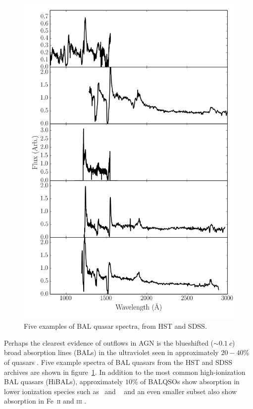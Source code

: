 \begin{figure}
\centering
\includegraphics[width=1.0\textwidth]{figures/02-outflows/bal_spectra.png}
\caption
{
Five examples of BAL quasar spectra, from HST and SDSS.
} 
\label{fig:bals}
\end{figure}

Perhaps the clearest evidence of outflows in AGN is  
the blueshifted ($\sim 0.1~c$) broad absorption lines (BALs) in the 
ultraviolet seen in approximately $20-40\%$ of quasars
\citep{weymann1991, knigge2008, dai2008, allen2011}. Five example
spectra of BAL quasars from the HST and SDSS archives are shown in 
figure~\ref{fig:bals}. In addition to the most common high-ionization
BAL quasars (HiBALs), approximately $10\%$ of BALQSOs show absorption
in lower ionization species such as \mgii\ and \aliii\ 
\citep[LoBALs;][]{voit1993,gibson2009}
and an even smaller subset also show absorption in Fe~\textsc{ii} and 
\textsc{iii} \citep[FeLoBALs;][]{becker2000,hall2002}. 

